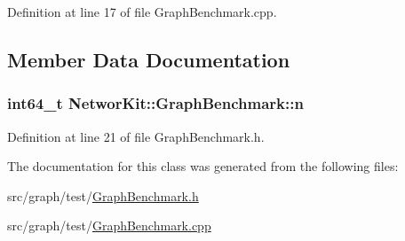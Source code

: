 Definition at line 17 of file Graph\-Benchmark.\-cpp.



\subsection{Member Data Documentation}
\hypertarget{class_networ_kit_1_1_graph_benchmark_ae3243c874ccfe0a1cfa50e4ada65deaf}{
\subsubsection[{n}]{\setlength{\rightskip}{0pt plus 5cm}int64\-\_\-t Networ\-Kit\-::\-Graph\-Benchmark\-::n\hspace{0.3cm}{\ttfamily [protected]}}}\label{class_networ_kit_1_1_graph_benchmark_ae3243c874ccfe0a1cfa50e4ada65deaf}


Definition at line 21 of file Graph\-Benchmark.\-h.



The documentation for this class was generated from the following files\-:\begin{DoxyCompactItemize}
\item 
src/graph/test/\hyperlink{_graph_benchmark_8h}{Graph\-Benchmark.\-h}\item 
src/graph/test/\hyperlink{_graph_benchmark_8cpp}{Graph\-Benchmark.\-cpp}\end{DoxyCompactItemize}
